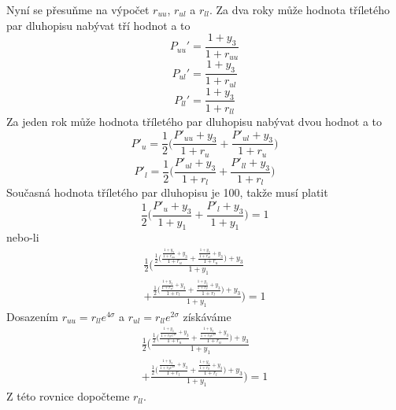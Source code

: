\documentclass[a4paper]{book}
\begin{document}
Nyní se přesuňme na výpočet $r_{uu}$, $r_{ul}$ a $r_{ll}$. Za dva roky může hodnota tříletého par dluhopisu nabývat tří hodnot a to
\begin{equation*}
P_{uu}' = \frac{1 + y_3}{1 + r_{uu}}
\end{equation*}
\begin{equation*}
P_{ul}' = \frac{1 + y_3}{1 + r_{ul}}
\end{equation*}
\begin{equation*}
P_{ll}' = \frac{1 + y_3}{1 + r_{ll}}
\end{equation*}
Za jeden rok může hodnota tříletého par dluhopisu nabývat dvou hodnot a to
\begin{equation*}
P'_u = \frac{1}{2}\Bigg( \frac{P'_{uu} + y_3}{1 + r_u} + \frac{P'_{ul} + y_3}{1 + r_u} \Bigg)
\end{equation*}
\begin{equation*}
P'_l = \frac{1}{2}\Bigg( \frac{P'_{ul} + y_3}{1 + r_l} + \frac{P'_{ll} + y_3}{1 + r_l} \Bigg)
\end{equation*}
Současná hodnota tříletého par dluhopisu je 100, takže musí platit
\begin{equation*}
\frac{1}{2} \Bigg( \frac{P'_u + y_3}{1 + y_1} + \frac{P'_l + y_3}{1 + y_1} \Bigg) = 1
\end{equation*}
nebo-li
\begin{equation*}
\begin{split}
\frac{1}{2} \Bigg( \frac{\frac{1}{2}\Big( \frac{\frac{1 + y_3}{1 + r_{uu}} + y_3}{1 + r_u} + \frac{\frac{1 + y_3}{1 + r_{ul}} + y_3}{1 + r_u} \Big) + y_3}{1 + y_1}\\ + \frac{\frac{1}{2}\Big( \frac{\frac{1 + y_3}{1 + r_{ul}} + y_3}{1 + r_l} + \frac{\frac{1 + y_3}{1 + r_{ll}} + y_3}{1 + r_l} \Big) + y_3}{1 + y_1} \Bigg) = 1
\end{split}
\end{equation*}
Dosazením $r_{uu} = r_{ll}e^{4\sigma}$ a $r_{ul} = r_{ll} e^{2 \sigma}$ získáváme
\begin{equation}
\begin{split}
\frac{1}{2} \Bigg( \frac{\frac{1}{2}\Big( \frac{\frac{1 + y_3}{1 + r_{ll}e^{4\sigma}} + y_3}{1 + r_u} + \frac{\frac{1 + y_3}{1 + r_{ll} e^{2 \sigma}} + y_3}{1 + r_u} \Big) + y_3}{1 + y_1}\\ + \frac{\frac{1}{2}\Big( \frac{\frac{1 + y_3}{1 + r_{ll} e^{2 \sigma}} + y_3}{1 + r_l} + \frac{\frac{1 + y_3}{1 + r_{ll}} + y_3}{1 + r_l} \Big) + y_3}{1 + y_1} \Bigg) = 1
\end{split}
\end{equation}
Z této rovnice dopočteme $r_{ll}$.
\end{document}
